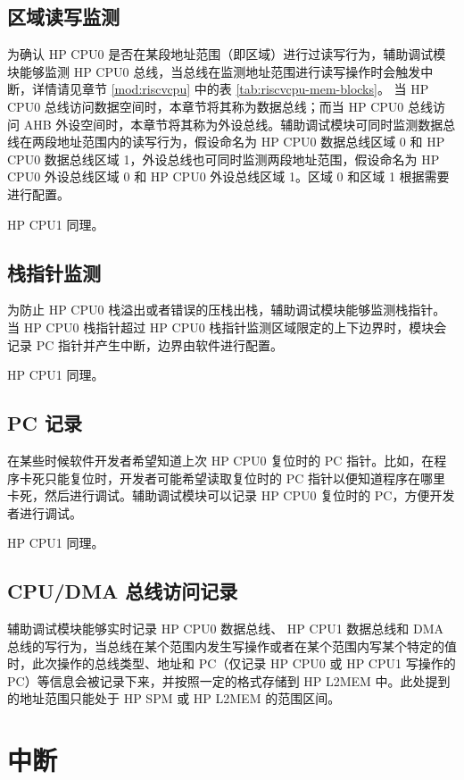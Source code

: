 \documentclass[main\_\_CN.tex]{subfiles}
\begin{document}
\subsection{区域读写监测}
为确认 HP CPU0 是否在某段地址范围（即区域）进行过读写行为，辅助调试模块能够监测 HP CPU0 总线，当总线在监测地址范围进行读写操作时会触发中断，详情请见章节 \ref{mod:riscvcpu} \textit{} 中的表 \ref{tab:riscvcpu-mem-blocks}。 当 HP CPU0 总线访问数据空间时，本章节将其称为数据总线；而当 HP CPU0 总线访问 AHB 外设空间时，本章节将其称为外设总线。辅助调试模块可同时监测数据总线在两段地址范围内的读写行为，假设命名为 HP CPU0 数据总线区域 0 和 HP CPU0 数据总线区域 1，外设总线也可同时监测两段地址范围，假设命名为 HP CPU0 外设总线区域 0 和 HP CPU0 外设总线区域 1。区域 0 和区域 1 根据需要进行配置。

HP CPU1 同理。

\subsection{栈指针监测}
为防止 HP CPU0 栈溢出或者错误的压栈出栈，辅助调试模块能够监测栈指针。当 HP CPU0 栈指针超过 HP CPU0 栈指针监测区域限定的上下边界时，模块会记录 PC 指针并产生中断，边界由软件进行配置。

HP CPU1 同理。

\subsection{PC 记录}
在某些时候软件开发者希望知道上次 HP CPU0 复位时的 PC 指针。比如，在程序卡死只能复位时，开发者可能希望读取复位时的 PC 指针以便知道程序在哪里卡死，然后进行调试。辅助调试模块可以记录 HP CPU0 复位时的 PC，方便开发者进行调试。

HP CPU1 同理。

\subsection{CPU/DMA 总线访问记录}
辅助调试模块能够实时记录 HP CPU0 数据总线、 HP CPU1 数据总线和 DMA 总线的写行为，当总线在某个范围内发生写操作或者在某个范围内写某个特定的值时，此次操作的总线类型、地址和 PC（仅记录 HP CPU0 或 HP CPU1 写操作的 PC）等信息会被记录下来，并按照一定的格式存储到 HP L2MEM 中。此处提到的地址范围只能处于 HP SPM 或 HP L2MEM 的范围区间。



\section{中断}
\label{sec:dbgassist-interrupts}
\end{document}
